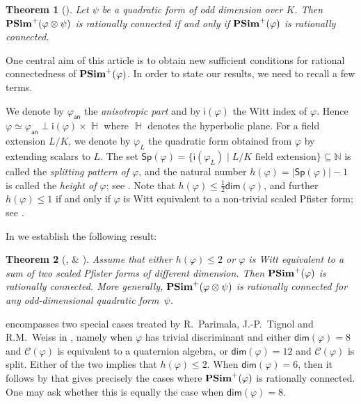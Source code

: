 \documentclass[twoside,11pt]{amsart}
\newtheorem{thmI}{Theorem}
\numberwithin{equation}{section}
\theoremstyle{definition}
\renewcommand{\dim}{\operatorname{\mathsf{dim}}}
\newcommand\hh{\operatorname{\mathbb{H}}}
\newcommand{\vf}{\varphi}
\newcommand{\nat}{\mathbb{N}}
\newcommand{\an}{\mathsf{an}}
\renewcommand{\leq}{\leqslant}
\newcommand{\mc}{\mathcal}
\renewcommand{\dim}{\mathsf{dim}}
\renewcommand{\leq}{\leqslant}
\newcommand{\Sp}{\mathsf{Sp}}
\newcommand{\wi}{\mathsf{i}}
\begin{document}
\begin{thmI}[]
Let $\psi$ be a quadratic form of odd dimension over $K$.
Then ${\bf PSim}^+(\vf\otimes\psi)$ is rationally connected if and only if ${\bf PSim}^+(\vf)$ is rationally connected.
\end{thmI}

One central aim of this article is to obtain new sufficient conditions for rational connectedness of ${\bf PSim}^+(\vf)$.
In order to state our results, we need to recall a few terms.

We denote by $\vf_\an$ the \emph{anisotropic part} and by $\wi(\vf)$ the Witt index of $\vf$. Hence $\vf\simeq \vf_\an\perp \wi(\vf)\times\hh$ where $\hh$ denotes the hyperbolic plane.
For a field extension $L/K$, we denote by $\vf_L$ the quadratic form obtained from $\vf$ by extending scalars to $L$.
The set
$\Sp(\vf)=\{\wi(\vf_L)\mid L/K\mbox{ field extension}\}\subseteq\nat$
is called the \emph{splitting pattern of $\vf$}, and the natural number 
 $h(\vf)=|\Sp(\vf)|-1$
is called the \emph{height of $\vf$}; see \cite[Sect.~25]{EKM08}.
Note that $h(\vf)\leq \frac{1}2\dim(\vf)$, and further $h(\vf)\leq 1$ if and only if $\vf$ is Witt equivalent to a non-trivial scaled Pfister form; see \cite[Prop.~25.6]{EKM08}.



In  we establish the following result:

\begin{thmI}[,  \& ]\label{T2}
    Assume that either $h(\varphi)\leq 2$ or $\varphi$ is Witt equivalent to a sum of two scaled Pfister forms of different dimension.
Then ${\bf PSim}^+(\vf)$ is rationally connected.
More generally, ${\bf PSim}^+(\vf\otimes\psi)$ is rationally connected for any odd-dimensional quadratic form~$\psi$.
\end{thmI}

  encompasses two special cases treated by R.~Parimala, J.-P.~Tignol and R.M.~Weiss in \cite[Theorem 1.1]{PTW12}, namely when $\vf$ has trivial discriminant and either $\dim(\vf)=8$ and $\mc{C}(\vf)$ is equivalent to a quaternion algebra, or  
$\dim(\vf)=12$ and $\mc{C}(\vf)$ is split.
Either of the two implies that $h(\vf)\leq 2$.
When $\dim(\vf)=6$, then it follows by \cite[Theorem 3]{Mer96} that 
 gives precisely the cases where ${\bf PSim}^+(\vf)$ is rationally connected.
One may ask whether this is equally the case when $\dim(\vf)=8$.
\end{document}
